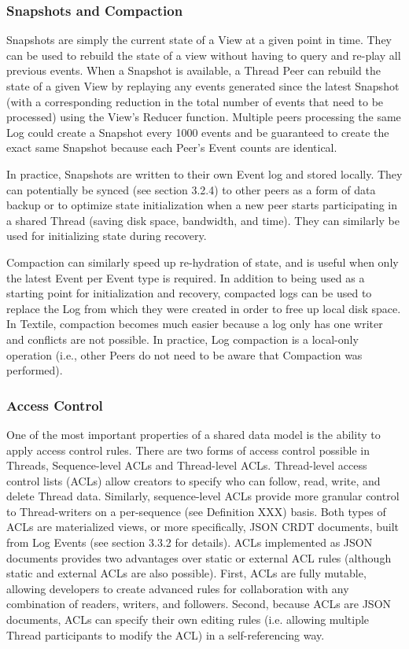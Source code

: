 \documentclass{comjnl}
\begin{document}
\subsubsection{Snapshots and Compaction}

Snapshots are simply the current state of a View at a given point in time. They can be used to rebuild the state of a view without having to query and re-play all previous events. When a Snapshot is available, a Thread Peer can rebuild the state of a given View by replaying any events generated since the latest Snapshot (with a corresponding reduction in the total number of events that need to be processed) using the View’s Reducer function. Multiple peers processing the same Log could create a Snapshot every 1000 events and be guaranteed to create the exact same Snapshot because each Peer’s Event counts are identical. 

In practice, Snapshots are written to their own Event log and stored locally. They can potentially be synced (see section 3.2.4) to other peers as a form of data backup or to optimize state initialization when a new peer starts participating in a shared Thread (saving disk space, bandwidth, and time). They can similarly be used for initializing state during recovery.

Compaction can similarly speed up re-hydration of state, and is useful when only the latest Event per Event type is required. In addition to being used as a starting point for initialization and recovery, compacted logs can be used to replace the Log from which they were created in order to free up local disk space. In Textile, compaction becomes much easier because a log only has one writer and conflicts are not possible. In practice, Log compaction is a local-only operation (i.e., other Peers do not need to be aware that Compaction was performed).

\subsubsection{Access Control}

One of the most important properties of a shared data model is the ability to apply access control rules. There are two forms of access control possible in Threads, Sequence-level ACLs and Thread-level ACLs. Thread-level access control lists (ACLs) allow creators to specify who can follow, read, write, and delete Thread data. Similarly, sequence-level ACLs provide more granular control to Thread-writers on a per-sequence (see Definition XXX) basis. Both types of ACLs are materialized views, or more specifically, JSON CRDT documents, built from Log Events (see section 3.3.2 for details). ACLs implemented as JSON documents provides two advantages over static or external ACL rules (although static and external ACLs are also possible). First, ACLs are fully mutable, allowing developers to create advanced rules for collaboration with any combination of readers, writers, and followers. Second, because ACLs are JSON documents, ACLs can specify their own editing rules (i.e. allowing multiple Thread participants to modify the ACL) in a self-referencing way.
\end{document}

